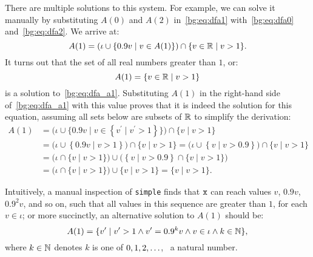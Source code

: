 There are multiple solutions to this system.  For example, we can solve
it manually by substituting $A(0)$ and $A(2)$ in~\eqref{bg:eq:dfa1}
with~\eqref{bg:eq:dfa0} and~\eqref{bg:eq:dfa2}.  We arrive at:
\begin{equation}
    A(1) = \left(
        \iota \cup \left\{ 0.9 v \mid v \in A(1) \right\}
    \right) \cap \{ v \in \mathbb{R} \mid v > 1 \}.
    \label{bg:eq:dfa_a1}
\end{equation}
It turns out that the set of all real numbers greater than $1$, or:
\begin{equation}
    A(1) = \{ v \in \mathbb{R} \mid v > 1 \}
    \label{bg:eq:a11}
\end{equation}
is a solution to~\eqref{bg:eq:dfa_a1}.  Substituting $A(1)$ in the right-hand
side of~\eqref{bg:eq:dfa_a1} with this value proves that it is indeed the
solution for this equation, assuming all sets below are subsets of $\mathbb{R}$
to simplify the derivation:
\begin{equation}
    \begin{aligned}
        A(1)
        &= \bigg( \iota \cup \Big\{ 0.9 v \mid v \in
                \left\{ v^\prime \mid v^\prime > 1 \right\}
           \Big\} \bigg) \cap \{ v \mid v > 1 \} \\
        &= \bigg( \iota \cup \left\{ 0.9 v \mid v > 1 \right\} \bigg) \cap
           \{ v \mid v > 1 \}
         = \bigg( \iota \cup \left\{ v \mid v > 0.9 \right\} \bigg) \cap
           \{ v \mid v > 1 \} \\
        &= \bigg( \iota \cap \{ v \mid v > 1 \} \bigg) \cup
           \bigg(
               \left\{ v \mid v > 0.9 \right\} \cap \{ v  \mid v > 1 \}
           \bigg) \\
        &= \bigg( \iota \cap \{ v \mid v > 1 \} \bigg) \cup
           \{ v \mid v > 1 \}
         = \{ v \mid v > 1 \}.
    \end{aligned}
\end{equation}

Intuitively, a manual inspection of \verb|simple| finds that $\texttt{x}$ can
reach values $v$, $0.9 v$, $0.9^2 v$, and so on, such that all values in this
sequence are greater than $1$, for each $v \in \iota$; or more succinctly, an
alternative solution to $A(1)$ should be:
\begin{equation}
    A(1) = \{ v^\prime \mid
        v^\prime > 1 \wedge
        v^\prime = 0.9^k v \wedge
        v \in \iota \wedge
        k \in \mathbb{N}
    \},
    \label{bg:eq:a12}
\end{equation}
where $k \in \mathbb{N}$ denotes $k$ is one of $0, 1, 2, \mathellipsis$, \ie~a
natural number.

